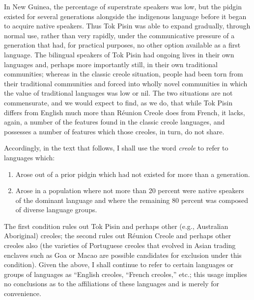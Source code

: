 In New Guinea, the percentage of superstrate speakers was low, but the pidgin existed for several generations alongside the indigenous language before it began to acquire native speakers. Thus Tok Pisin was able to expand gradually, through normal use, rather than very rapidly, under the communicative pressure of a generation that had, for practical purposes, no other option available as a first language. The bilingual speakers of Tok Pisin had ongoing lives in their own languages and, perhaps more importantly still, in their own traditional communities; whereas in the classic creole situation, people had been torn from their traditional communities and forced into wholly novel communities in which the value of traditional languages was low or nil. The two situations are not commensurate, and we would expect
to find, as we do, that while Tok Pisin differs from English much more than Réunion Creole does from French, it lacks, again, a number of the features found in the classic creole languages, and possesses a number of features which those creoles, in turn, do not share.

Accordingly, in the text that follows, I shall use the word \textit{creole}
to refer to languages which:

\begin{enumerate}
\item Arose out of a prior pidgin which had not existed for more than a generation.
\item Arose in a population where not more than 20 percent were native speakers of the dominant language and where the remaining 80 percent was composed of diverse language groups.
\end{enumerate}



The first condition rules out Tok Pisin and perhaps other (e.g., Austra\-lian Aboriginal) creoles; the second rules out Réunion Creole and perhaps other creoles also (the varieties of Portuguese creoles that evolved in Asian trading enclaves such as Goa or Macao are possible candidates for exclusion under this condition). Given the above, I shall continue to refer to certain languages or groups of languages as ``English creoles,{\textquotedbl} ``French creoles,'' etc.; this usage implies no conclusions as to the affiliations of these languages and is merely for convenience.

